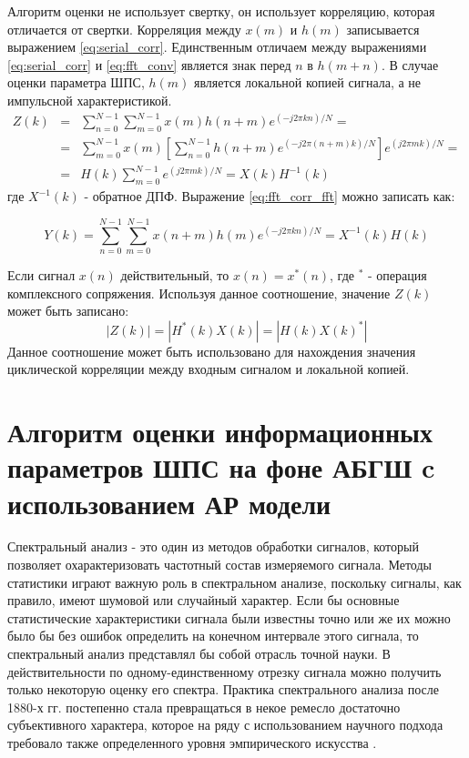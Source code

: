 Алгоритм оценки не использует свертку, он использует корреляцию, которая отличается от свертки. Корреляция
между $x(m)$ и $h(m)$ записывается выражением \ref{eq:serial_corr}.
Единственным отличаем между выражениями \ref{eq:serial_corr} и \ref{eq:fft_conv} является знак перед $n$ в ${h(m+n)}$.
В случае оценки параметра ШПС, $h(m)$ является локальной копией сигнала, а не импульсной характеристикой.
\begin{eqnarray}
	\label{eq:fft_corr_fft}
	Z(k) & = & \sum\limits_{n=0}^{N-1}\sum\limits_{m=0}^{N-1}{x(m)h(n+m)e^{(-j2\pi{kn})/N}}=\nonumber \\
	& = & \sum\limits_{m=0}^{N-1}{x(m)}[\sum\limits_{n=0}^{N-1}h(n+m)e^{(-j2\pi{(n+m)}k)/N}]e^{(j2\pi{m}k)/N}=\\
	& = & H(k)\sum\limits_{m=0}^{N-1}e^{(j2\pi{m}k)/N} = X(k)H^{-1}(k)\nonumber 
\end{eqnarray}
где ${X^{-1}(k)}$ - обратное ДПФ. Выражение \ref{eq:fft_corr_fft} можно записать как:

\begin{equation}
	\label{eq:fft_corr_fft_rev}
	Y(k) = \sum\limits_{n=0}^{N-1}\sum\limits_{m=0}^{N-1}{x(n+m)h(m)e^{(-j2\pi{kn})/N}}=X^{-1}(k)H(k)
\end{equation}

Если сигнал $x(n)$ действительный, то $x(n) = x^*(n)$, где ${^*}$ - операция комплексного сопряжения. Используя данное соотношение,
значение $Z(k)$ может быть записано:
\begin{equation}
	\label{eq:fft_magnitude}
	|Z(k)|=|H^*(k)X(k)|=|H(k)X(k)^*|
\end{equation}
Данное соотношение может быть использовано для нахождения значения циклической корреляции между входным сигналом и 
локальной копией.

\section{Алгоритм оценки информационных параметров ШПС на фоне АБГШ c использованием АР модели}
Спектральный анализ - это один из методов обработки сигналов, который позволяет охарактеризовать частотный состав измеряемого сигнала.
Методы статистики играют важную роль в спектральном анализе, поскольку сигналы, как правило, имеют шумовой или случайный характер. Если бы
основные статистические характеристики сигнала были известны точно или же их можно было бы без ошибок определить на конечном интервале этого
сигнала, то спектральный анализ представлял бы собой отрасль точной науки. В действительности по одному-единственному отрезку сигнала можно
получить только некоторую оценку его спектра. Практика спектрального анализа после 1880-х гг. постепенно стала превращаться в некое ремесло
достаточно субъективного характера, которое на ряду с использованием научного подхода требовало также определенного уровня эмпирического
искусства \cite{marpl_book}.

